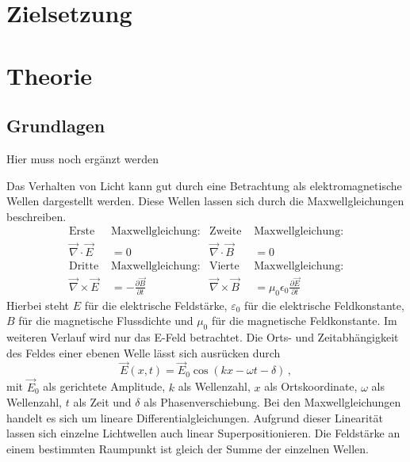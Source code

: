 \section{Zielsetzung}
\label{sec:Zielsetzung}

\section{Theorie}
\label{sec:Theorie}

\subsection{Grundlagen}
\label{sec:Grundlagen}

Hier muss noch ergänzt werden

Das Verhalten von Licht kann gut durch eine Betrachtung als elektromagnetische Wellen
dargestellt werden. Diese Wellen lassen sich durch die Maxwellgleichungen beschreiben.
\begin{align*}
    \text{Erste } & \text{Maxwellgleichung:} & \text{Zweite } & \text{Maxwellgleichung:} \\
    \vec{\nabla} \cdot \vec{E} &= 0 & \vec{\nabla} \cdot \vec{B} &= 0 \\
    \text{Dritte } & \text{Maxwellgleichung:} & \text{Vierte } & \text{Maxwellgleichung:} \\
    \vec{\nabla} \times \vec{E} &= - \frac{\partial \vec{B}}{\partial t}   &  \vec{\nabla} \times \vec{B} &= \mu_0 \epsilon_0 \frac{\partial \vec{E}}{\partial t}
\end{align*}
Hierbei steht $E$ für die elektrische Feldstärke, $ε_0$ für die elektrische Feldkonstante,
$B$ für die magnetische Flussdichte und $μ_0$ für die magnetische Feldkonstante.
Im weiteren Verlauf wird nur das E-Feld betrachtet.
Die Orts- und Zeitabhängigkeit des Feldes einer ebenen Welle lässt sich ausrücken durch
\begin{equation*}
    \vec{E}\left(x,t\right) = \vec{E}_0 \cos\left( k x - ω t - δ\right)\, ,
\end{equation*}
mit $\vec{E}_0$ als gerichtete Amplitude, $k$ als Wellenzahl, $x$ als Ortskoordinate, $ω$ als Wellenzahl, $t$ als Zeit und $δ$ als Phasenverschiebung.
Bei den Maxwellgleichungen handelt es sich um lineare Differentialgleichungen.
Aufgrund dieser Linearität lassen sich einzelne Lichtwellen auch linear Superpositionieren.
Die Feldstärke an einem bestimmten Raumpunkt ist gleich der Summe der einzelnen Wellen.
